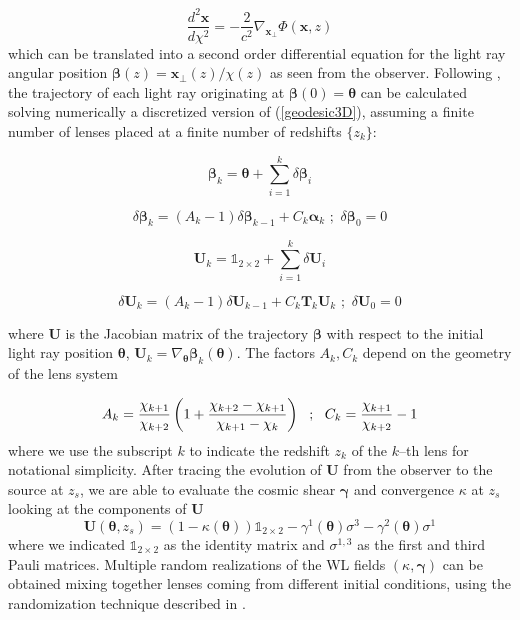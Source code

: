 \documentclass[5p]{elsarticle}
\newcommand{\bb}[1]{\mathbf{#1}}
\begin{document}
\begin{equation}
\label{geodesic3D}
\frac{d^2\bb{x}}{d\chi^2} = -\frac{2}{c^2}\nabla_\bb{x_\perp}\Phi(\bb{x},z)
\end{equation}
%
which can be translated into a second order differential equation for the light ray angular position $\pmb{\beta}(z)=\bb{x}_\perp(z)/\chi(z)$ as seen from the observer. Following \citep{RayTracingHartlap}, the trajectory of each light ray originating at $\pmb{\beta}(0)=\pmb{\theta}$ can be calculated solving numerically a discretized version of (\ref{geodesic3D}), assuming a finite number of lenses placed at a finite number of redshifts $\{z_k\}$:
%

\begin{equation}
\label{geodesic2D}
\pmb{\beta}_{k} = \pmb{\theta} + \sum_{i=1}^k\delta\pmb{\beta}_i 
\end{equation}

\begin{equation}
\label{deflections}
\delta\pmb{\beta}_k = (A_k-1)\delta\pmb{\beta}_{k-1} + C_k\pmb{\alpha}_k \,\, ; \,\, \delta\pmb{\beta}_0=0
\end{equation}

\begin{equation}
\label{jacobian}
\bb{U}_{k} = \mathds{1}_{2\times2} + \sum_{i=1}^k\delta\bb{U}_i 
\end{equation}

\begin{equation}
\label{sheartensorproduct}
\delta\bb{U}_k = (A_k-1)\delta\bb{U}_{k-1} + C_k\bb{T}_k\bb{U}_k \,\, ; \,\, \delta\bb{U}_0=0
\end{equation}

%
where $\bb{U}$ is the Jacobian matrix of the trajectory $\pmb{\beta}$ with respect to the initial light ray position $\pmb{\theta}$, $\bb{U}_k=\nabla_{\pmb{\theta}}\pmb{\beta}_k(\pmb{\theta})$. The factors $A_k,C_k$ depend on the geometry of the lens system

\begin{equation}
A_k = \frac{\chi_{k+1}}{\chi_{k+2}}\left(1 + \frac{\chi_{k+2}-\chi_{k+1}}{\chi_{k+1}-\chi_k}\right) \,\,\,\, ; \,\,\,\, C_k = \frac{\chi_{k+1}}{\chi_{k+2}} - 1 \\ \\
\end{equation} 
%
where we use the subscript $k$ to indicate the redshift $z_k$ of the $k$--th lens for notational simplicity. After tracing the evolution of $\bb{U}$ from the observer to the source at $z_s$, we are able to evaluate the cosmic shear $\pmb{\gamma}$ and convergence $\kappa$ at $z_s$ looking at the components of $\bb{U}$
\begin{equation}
\bb{U}(\pmb{\theta},z_s) = (1-\kappa(\pmb{\theta}))\mathds{1}_{2\times2} - \gamma^1(\pmb{\theta})\sigma^3 - \gamma^2(\pmb{\theta})\sigma^1
\end{equation}
%
where we indicated $\mathds{1}_{2\times2}$ as the identity matrix and $\sigma^{1,3}$ as the first and third Pauli matrices. Multiple random realizations of the WL fields $(\kappa,\pmb{\gamma})$ can be obtained mixing together lenses coming from different initial conditions, using the randomization technique described in \citep{Petri16}.
\end{document}
